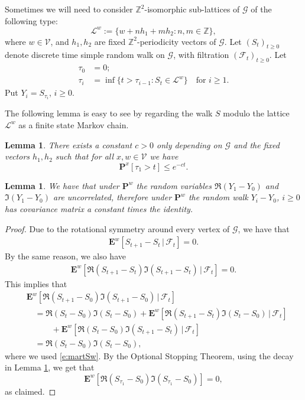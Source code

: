 \documentclass[11pt]{article}
\newtheorem{lemma}[theorem]{Lemma}
\theoremstyle{remark}
\def\E{\mathbf{E}}
\def\Z{\mathbb{Z}}
\def\cF{\mathcal{F}}
\def\cG{\mathcal{G}}
\def\cV{\mathcal{V}}
\newcommand{\eqn}[2]{\begin{equation}\label{#1}#2\end{equation}}
\newcommand{\eqnst}[1]{\begin{equation*}#1\end{equation*}}
\newcommand{\eqnspl}[2]{\begin{equation}\begin{split}\label{#1}%
   #2\end{split}\end{equation}}
\newcommand{\eqnsplst}[1]{\begin{equation*}\begin{split}%
   #1\end{split}\end{equation*}}
\begin{document}
Sometimes we will need to consider $\Z^2$-isomorphic sub-lattices of $\cG$ of the following type:
\eqnst{
  \mathcal{L}^w 
  := \{ w + n h_1 + m h_2 : n, m \in \mathbb{Z} \}, }
where $w \in \cV$, and $h_1, h_2$ are fixed $\mathbb{Z}^2$-periodicity vectors of $\cG$. 
Let $(S_t)_{t \ge 0}$ denote discrete time simple random walk on $\cG$, with 
filtration $(\cF_t)_{t \ge 0}$. Let 
\eqnsplst{
  \tau_0
  &= 0; \\
  \tau_i
  &= \inf \{ t > \tau_{i-1} : S_t \in \mathcal{L}^w \} \quad \text{for $i \ge 1$.} }
Put $Y_i = S_{\tau_i}$, $i \ge 0$.

The following lemma is easy to see by regarding the walk $S$ modulo the lattice $\mathcal{L}^w$
as a finite state Markov chain.

\begin{lemma}
\label{lem:tau-decay}
There exists a constant $c > 0$ only depending on $\cG$ and the fixed vectors $h_1, h_2$ such 
that for all $x, w \in \cV$ we have
\eqn{e:tau-decay}{
  \mathbf{P}^x [ \tau_1 > t]
  \le e^{- c t}. }
\end{lemma}

\begin{lemma}
\label{lem:Y-uncorr}
We have that under $\mathbf{P}^w$ the random variables $\Re (Y_1-Y_0)$ and $\Im (Y_1-Y_0)$ are uncorrelated, 
therefore under $\mathbf{P}^w$ the random walk $Y_i - Y_0$, $i \ge 0$ has covariance matrix a
constant times the identity.
\end{lemma}

\begin{proof}
Due to the rotational symmetry around every vertex of $\cG$, we have that
\eqnspl{e:martSw}{
  \E^w [ S_{t+1} - S_t \,|\, \cF_t ] = 0. }
By the same reason, we also have
\eqnsplst{
  \E^w [ \Re(S_{t+1} - S_t) \Im(S_{t+1} - S_{t}) \,|\, \cF_t ]
  = 0. }
This implies that
\eqnsplst{
  &\E^w [ \Re(S_{t+1} - S_0) \Im(S_{t+1} - S_0) \,|\, \cF_t ] \\
  &\quad = \Re(S_{t} - S_0) \Im(S_{t} - S_0) 
    + \E^w [ \Re(S_{t+1} - S_t) \Im(S_{t} - S_0) \,|\, \cF_t ] \\
  &\qquad\quad + \E^w [ \Re(S_{t} - S_0) \Im(S_{t+1} - S_t) \,|\, \cF_t ] \\
  &\quad = \Re(S_{t} - S_0) \Im(S_{t} - S_0), }
where we used \eqref{e:martSw}. By the Optional Stopping Theorem, using the decay in Lemma 
\ref{lem:tau-decay},
we get that
\eqnst{
  \E^w [ \Re(S_{\tau_1} - S_0) \Im(S_{\tau_1} - S_0) ]
  = 0, }
as claimed.
\end{proof}
\end{document}
